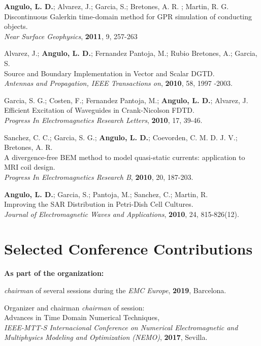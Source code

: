 \documentclass[margin,line]{res}
\begin{document}
{\bf Angulo, L. D.}; Alvarez, J.; Garcia, S.; Bretones, A. R. ; Martin, R. G.\\
Discontinuous Galerkin time-domain method for GPR simulation of conducting objects.\\
{\it Near Surface Geophysics}, {\bf 2011}, 9, 257-263

Alvarez, J.; {\bf Angulo, L. D.}; Fernandez Pantoja, M.; Rubio Bretones, A.; Garcia, S.\\
Source and Boundary Implementation in Vector and Scalar DGTD.\\
{\it Antennas and Propagation, IEEE Transactions on}, {\bf 2010}, 58, 1997 -2003.

Garcia, S. G.; Costen, F.; Fernandez Pantoja, M.; {\bf Angulo, L. D.}; Alvarez, J.\\
Efficient Excitation of Waveguides in Crank-Nicolson FDTD.\\
{\it Progress In Electromagnetics Research Letters}, {\bf 2010}, 17, 39-46.

Sanchez, C. C.; Garcia, S. G.; {\bf Angulo, L. D.}; Coevorden, C. M. D. J. V.; Bretones, A. R.\\
A divergence-free BEM method to model quasi-static currents: application to MRI coil design.\\
{\it Progress In Electromagnetics Research B}, {\bf 2010}, 20, 187-203.

{\bf Angulo, L. D.}; Garcia, S.; Pantoja, M.; Sanchez, C.; Martin, R.\\ 
Improving the SAR Distribution in Petri-Dish Cell Cultures.\\
{\it Journal of Electromagnetic Waves and Applications}, {\bf 2010}, 24, 815-826(12).


\section{\sc Selected Conference Contributions}

\textbf{As part of the organization:}\\[0.5cm]
\begin{minipage}{\textwidth}
	\textit{chairman} of several sessions during the \textit{EMC Europe}, \textbf{2019}, Barcelona.
\end{minipage}

\begin{minipage}{\textwidth}
	Organizer and chairman \textit{chairman} of session:\\
	Advances in Time Domain Numerical Techniques,\\
	\textit{IEEE-MTT-S Internacional Conference on Numerical Electromagnetic and Multiphysics Modeling and Optimization (NEMO)}, \textbf{2017}, Sevilla.
\end{minipage}
\end{document}

